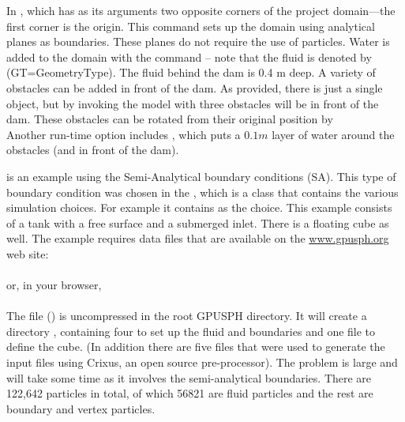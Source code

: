 \documentclass{../GPUSPHtemplate}
\begin{document}
In  , 
which has as its arguments two opposite corners of the 
project domain—the first corner is the origin. 
This command sets up the domain using analytical planes as boundaries. 
These planes do not require the use of particles.  
Water is added to the domain with the  command -- 
note that the fluid is denoted by   (GT=GeometryType).  
The fluid behind the dam is 0.4 m deep.  
A variety of obstacles can be added in front of the dam.  
As provided, there is just a single object, but by invoking the model with
three obstacles will be in front of the dam.  
These obstacles can be rotated from their original position 
by \\

Another run-time option includes , 
which puts a $0.1m$ layer of water around the obstacles (and in front of the dam).  


 is an example using the Semi-Analytical boundary conditions (SA). 
This type of boundary condition was chosen in the  , 
which is a class that contains the various simulation choices. 
For example it contains  as the choice.   
This example consists of a tank with a free surface and a submerged inlet.  
There is a floating cube as well.  
The example requires data files that are available on the \url{www.gpusph.org} web site:\\
\\

or, in your browser,\\
\\

The file () is uncompressed 
in the root GPUSPH directory.  
It will create a directory , containing four  
to set up the fluid and boundaries and one  file to define the cube.  
(In addition there are five files that were used to generate the input files 
using Crixus, an open source pre-processor).  
The problem is large and will take some time as it involves the semi-analytical boundaries.  
There are 122,642 particles in total, of which 56821 are fluid particles 
and the rest are boundary and vertex particles.  
\end{document}

